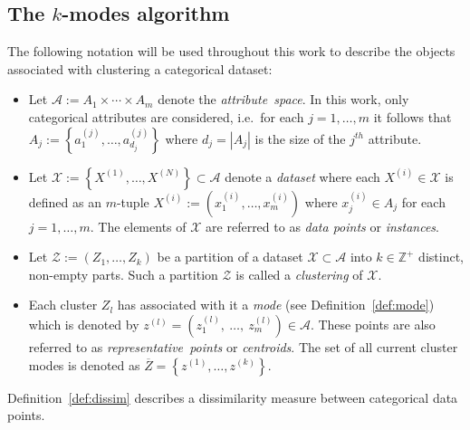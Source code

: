 \documentclass[smallextended]{svjour3}
\begin{document}
\subsection{The \(k\)-modes algorithm}\label{subsec:kmodes}

The following notation will be used throughout this work to describe the objects
associated with clustering a categorical dataset:

\begin{itemize}
    \item Let \(\mathcal{A} := A_1 \times \cdots \times A_m\) denote the
        \emph{attribute~space}. In this work, only categorical attributes are
        considered, i.e.\ for each \(j = 1, \ldots, m\) it follows that \(A_j :=
        \left\{a_1^{(j)}, \ldots, a_{d_j}^{(j)}\right\}\) where \(d_j = |A_j|\)
        is the size of the \(j^{th}\) attribute.

    \item Let \(\mathcal{X} := \left\{X^{(1)}, \ldots, X^{(N)}\right\} \subset
        \mathcal{A}\) denote a \emph{dataset} where each \(X^{(i)} \in
        \mathcal{X}\) is defined as an \(m\)-tuple \(X^{(i)} := \left(x_1^{(i)},
        \ldots, x_m^{(i)}\right)\) where \(x_j^{(i)} \in A_j\) for each \(j = 1,
        \ldots, m\). The elements of \(\mathcal{X}\) are referred to as
        \emph{data points} or \emph{instances}.
    \item Let \(\mathcal{Z} := \left(Z_1, \ldots, Z_k\right)\) be a partition
        of a dataset \(\mathcal{X} \subset \mathcal A\) into \(k \in
        \mathbb{Z}^{+}\) distinct, non-empty parts. Such a partition
        \(\mathcal{Z}\) is called a \emph{clustering} of \(\mathcal{X}\).

    \item Each cluster \(Z_l\) has associated with it a
        \emph{mode} (see Definition~\ref{def:mode}) which is
        denoted by \(z^{(l)} = \left(z_1^{(l)},~\ldots,~z_m^{(l)}\right) \in
        \mathcal{A}\).  These points are also referred to as
        \emph{representative~points} or \emph{centroids}. The set of all current
        cluster modes is denoted as \(\overline Z = \left\{z^{(1)}, \ldots,
        z^{(k)}\right\}\).
\end{itemize}

Definition~\ref{def:dissim} describes a dissimilarity measure between
categorical data points.
\end{document}
